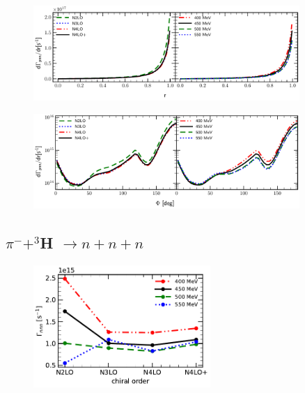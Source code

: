     \begin{figure}[h]
        \begin{center}
        \includegraphics[width=0.9\textwidth]{PlotData/PION/Dalitz_maps/figures/3HE_dGdr.pdf}
        \end{center}
        \caption{}
        \label{pion_dGdEr}
    \end{figure}

    \begin{figure}[h]
        \begin{center}
        \includegraphics[width=0.9\textwidth]{PlotData/PION/Dalitz_maps/figures/3HE_dGdphi.pdf}
        \end{center}
        \caption{}
        \label{pion_dGdphi}
    \end{figure}


    \clearpage
    \subsection{$\pi^- + ^3$H $\rightarrow n + n + n$}

    \begin{figure}[h]
        \begin{center}
        \includegraphics[width=0.6\textwidth]{PlotData/PION/Dalitz_maps/figures/Gamma_nnn.pdf}
        \end{center}
        \caption{}
        \label{Gamma_nnn}
    \end{figure}


